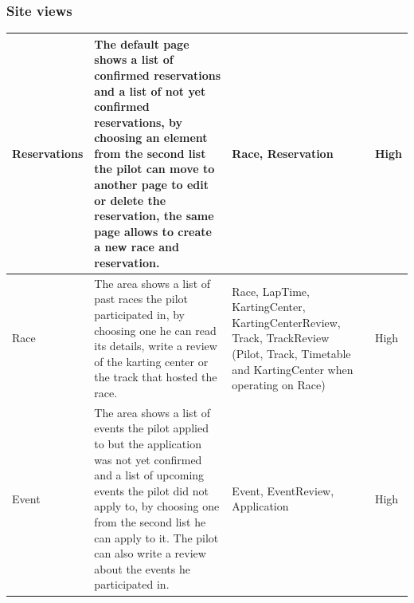 \documentclass{beamer}
\begin{document}
\begin{frame}
    \frametitle{Site views}
    \begin{table}
        \centering
        \tiny
        \setlength{\tabcolsep}{1pt}
        \begin{tabular}{|m{2cm}|m{4cm}|m{3cm}|m{1cm}|}
        \hline
        Reservations & The default page shows a list of confirmed reservations and a list of not yet confirmed reservations,
        by choosing an element from the second list the pilot can move to another page to edit or delete the reservation, the same page allows
        to create a new race and reservation.
         & Race, Reservation & High \\
        \hline
        Race & The area shows a list of past races the pilot participated in, by choosing one he can read its details,
        write a review of the karting center or the track that hosted the race.
         & Race, LapTime, KartingCenter, KartingCenterReview, Track, TrackReview
        (Pilot, Track, Timetable and KartingCenter when operating on Race) & High \\
        \hline
        Event & The area shows a list of events the pilot applied to but 
        the application was not yet confirmed and 
        a list of upcoming events the pilot did not apply to, by choosing one from the second list
         he can apply to it. The pilot can also write a review about the events he participated in.
         & Event, EventReview, Application & High \\
        \hline
        \end{tabular}
    \end{table}
\end{frame}
\end{document}
